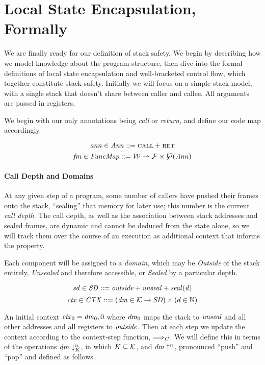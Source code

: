 \documentclass[acmsmall,review,anonymous]{acmart}\settopmatter{printfolios=true,printccs=false,printacmref=false}
\newcommand{\powerset}{\raisebox{.15\baselineskip}{\Large\ensuremath{\wp}}}
\begin{document}
\section{Local State Encapsulation, Formally}
\label{sec:lse}

We are finally ready for our definition of stack safety. We begin
by describing how we model knowledge about the program structure,
then dive into the formal definitions of local state encapsulation and
well-bracketed control flow, which together constitute stack safety.
Initially we will focus on a simple stack model, with a single stack
that doesn't share between caller and callee. All arguments are passed
in registers.

We begin with our only annotations being {\em call} or {\em return}, and
define our code map accordingly.

\[\mathit{ann} \in \mathit{Ann} ::= \text{\sc call} + \text{\sc ret}\]
\[\codemap \in \CODEMAPS ::= \WORDS \rightharpoonup \FUNIDS \times \powerset(\ANNS)\]

\paragraph*{Call Depth and Domains}

At any given step of a program, some number of callers have pushed their frames
onto the stack, ``sealing'' that memory for later use; this number is the current
{\em call depth}. The call depth, as well as the association between stack addresses
and sealed frames, are dynamic and cannot be deduced from the state alone, so we will
track them over the course of an execution as additional context that informs the property.

Each component will be assigned to a {\em domain}, which may be {\em Outside} of the
stack entirely, {\em Unsealed} and therefore accessible, or {\em Sealed} by a particular
depth.

\[\mathit{sd} \in \mathit{SD} ::= \mathit{outside} + \mathit{unseal} + \mathit{seal(d)}\]
\[\mathit{ctx} \in \mathit{CTX} ::= (\mathit{dm} \in {\mathcal K} \rightarrow \mathit{SD})
  \times (d \in \mathbb{N}) \]

An initial context \(\mathit{ctx}_0 = \mathit{dm}_0, 0\) where \(\mathit{dm}_0\) maps
the stack to \(\mathit{unseal}\) and all other addresses and all registers to \(\mathit{outside}\).
Then at each step we update the context according to the context-step function,
\(\Longrightarrow_C\). We will define this in terms of the operations
\(\mathit{dm} \downarrow^{n}_{K}\), in which \(K \subseteq {\mathcal K}\),
and \(\mathit{dm} \uparrow^{n}\), pronounced ``push'' and ``pop'' and defined as follows.
\end{document}

